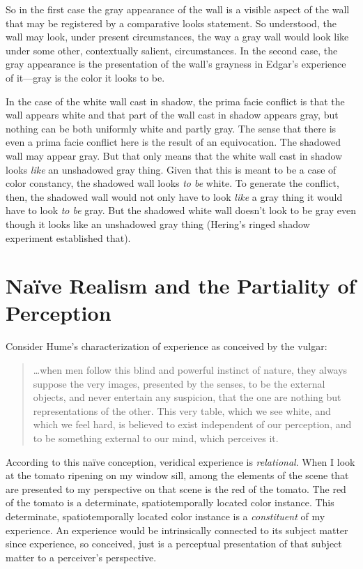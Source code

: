 \documentclass[12pt]{article}
\begin{document}
So in the first case the gray appearance of the wall is a visible aspect of the wall that may be registered by a comparative looks statement. So understood, the wall may look, under present circumstances, the way a gray wall would look like under some other, contextually salient, circumstances. In the second case, the gray appearance is the presentation of the wall's grayness in Edgar's experience of it---gray is the color it looks to be.

In the case of the white wall cast in shadow, the prima facie conflict is that the wall appears white and that part of the wall cast in shadow appears gray, but nothing can be both uniformly white and partly gray. The sense that there is even a prima facie conflict here is the result of an equivocation. The shadowed wall may appear gray. But that only means that the white wall cast in shadow looks \emph{like} an unshadowed gray thing. Given that this is meant to be a case of color constancy, the shadowed wall looks \emph{to be} white. To generate the conflict, then, the shadowed wall would not only have to look \emph{like} a gray thing it would have to look \emph{to be} gray. But the shadowed white wall doesn't look to be gray even though it looks like an unshadowed gray thing (Hering's ringed shadow experiment established that).


\section{Naïve Realism and the Partiality of Perception} %
\label{sec:naïve_realism_and_the_partiality_of_perception}

Consider Hume's characterization of experience as conceived by the vulgar:
\begin{quote}
    \ldots when men follow this blind and powerful instinct of nature, they always suppose the very images, presented by the senses, to be the external objects, and never entertain any suspicion, that the one are nothing but representations of the other. This very table, which we see white, and which we feel hard, is believed to exist independent of our perception, and to be something external to our mind, which perceives it. \citep[113--4]{Hume:1740lr}
\end{quote}
According to this naïve conception, veridical experience is \emph{relational}. When I look at the tomato ripening on my window sill, among the elements of the scene that are presented to my perspective on that scene is the red of the tomato. The red of the tomato is a determinate, spatiotemporally located color instance. This determinate, spatiotemporally located color instance is a \emph{constituent} of my experience. An experience would be intrinsically connected to its subject matter since experience, so conceived, just is a perceptual presentation of that subject matter to a perceiver's perspective.
\end{document}
